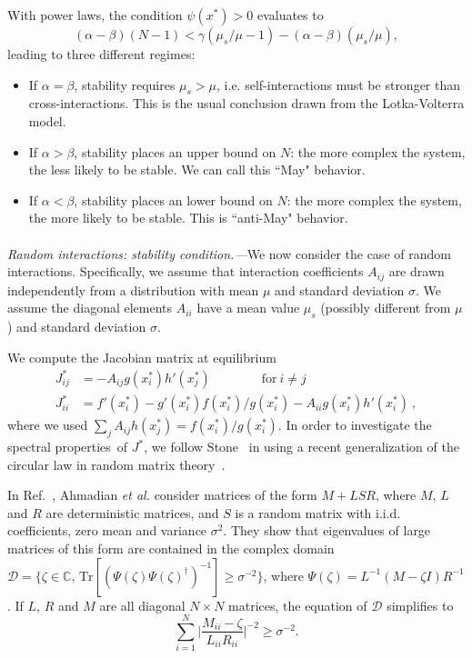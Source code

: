 \documentclass[
 prl,
 twocolumn,
 amsmath,
 amssymb,
 aps,
]{revtex4-2}
\begin{document}
With power laws, the condition $\psi(x^*)>0$ evaluates to 
\begin{equation}
    (\alpha - \beta)(N-1) < \gamma(\mu_s/\mu- 1) - (\alpha - \beta)(\mu_s/\mu),
\end{equation}
leading to three different regimes:
\begin{itemize}
    \item If $\alpha = \beta$, stability requires $\mu_s > \mu$, i.e.
    self-interactions must be stronger than cross-interactions.
    This is the usual conclusion drawn from the Lotka-Volterra model.
    \item If $\alpha > \beta$, stability places an upper bound on $N$: the more complex the system, the less likely to be stable.
    We can call this ``May" behavior.
    \item If $\alpha < \beta$, stability places an lower bound on $N$: the more complex the system, the more likely to be stable.
    This is ``anti-May" behavior.
\end{itemize}

\paragraph*{}
\emph{Random interactions: stability condition.---}We now consider the case of random interactions.
Specifically, we assume that interaction coefficients $A_{ij}$ are drawn independently from a distribution with mean $\mu$ and standard deviation $\sigma$.
We assume the diagonal elements $A_{ii}$ have a mean value $\mu_s$ (possibly different from $\mu$) and standard deviation $\sigma$. 
 
We compute the Jacobian matrix at equilibrium
\begin{align}
    J_{ij}^* & = - A_{ij}g(x_i^*)h'(x_j^*) \qquad \qquad \textrm{for} \ i\neq j \label{eq: jac off-diag}\\
    J_{ii}^* & = f'(x_i^*) - g'(x_i^*)f(x_i^*)/g(x_i^*) - A_{ii}g(x_i^*)h'(x_i^*) \ , \label{eq: jac diag}
\end{align}
where we used $\sum_{j}A_{ij}h(x_j^*)=f(x_i^*)/g(x_i^*)$.
In order to investigate the spectral properties of $J^*$, 
we follow Stone~\cite{Stone2018} in using a recent generalization of the circular law in random matrix theory~\cite{Ahmadian2015}.

In Ref.~\cite{Ahmadian2015}, Ahmadian \emph{et al.} consider matrices of the form $M + LSR$, where $M$,  
$L$ and $R$ are deterministic matrices, and $S$ is a random matrix with i.i.d. coefficients, zero mean and variance $\sigma^2$.
They show that eigenvalues of large matrices of this form are contained in the complex domain $\mathcal{D} = \{\zeta \in \mathbb{C},\, \textrm{Tr}[(\Psi(\zeta) \Psi(\zeta)^\dagger)^{-1}]\geq \sigma^{-2}\}$, where $\Psi(\zeta) = L^{-1}(M-\zeta I)R^{-1}$. If $L$, $R$ and $M$ are all diagonal $N\times N$ matrices, the equation of $\mathcal{D}$ simplifies to 
\begin{equation}
    \sum_{i=1}^N\Big\vert\frac{M_{ii} - \zeta}{L_{ii}R_{ii}}\Big\vert^{-2}\geq \sigma^{-2}.
\label{eq: domain}
\end{equation}
\end{document}
